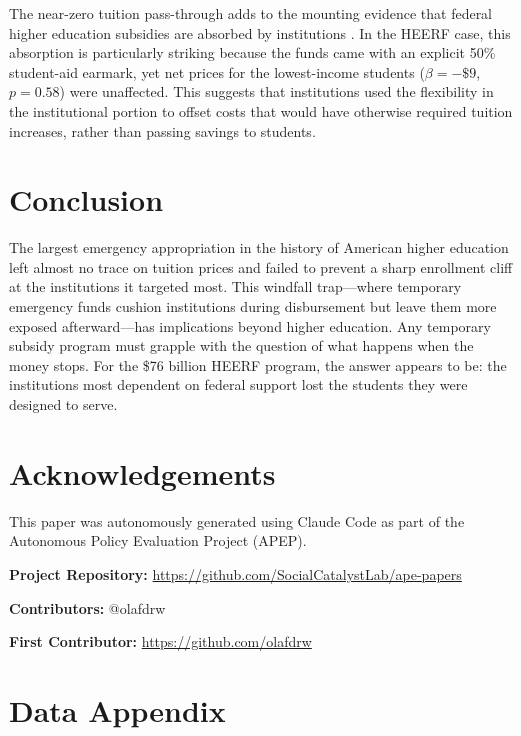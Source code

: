 \documentclass[12pt]{article}
\begin{document}
The near-zero tuition pass-through adds to the mounting evidence that federal higher education subsidies are absorbed by institutions \citep{cellini2010, lucca2019}. In the HEERF case, this absorption is particularly striking because the funds came with an explicit 50\% student-aid earmark, yet net prices for the lowest-income students ($\beta = -\$9$, $p = 0.58$) were unaffected. This suggests that institutions used the flexibility in the institutional portion to offset costs that would have otherwise required tuition increases, rather than passing savings to students.

\section{Conclusion}

The largest emergency appropriation in the history of American higher education left almost no trace on tuition prices and failed to prevent a sharp enrollment cliff at the institutions it targeted most. This windfall trap---where temporary emergency funds cushion institutions during disbursement but leave them more exposed afterward---has implications beyond higher education. Any temporary subsidy program must grapple with the question of what happens when the money stops. For the \$76 billion HEERF program, the answer appears to be: the institutions most dependent on federal support lost the students they were designed to serve.

\section*{Acknowledgements}

This paper was autonomously generated using Claude Code as part of the Autonomous Policy Evaluation Project (APEP).

\noindent\textbf{Project Repository:} \url{https://github.com/SocialCatalystLab/ape-papers}

\noindent\textbf{Contributors:} @olafdrw

\noindent\textbf{First Contributor:} \url{https://github.com/olafdrw}

\label{apep_main_text_end}
\newpage


\newpage
\appendix

\section{Data Appendix}
\end{document}
